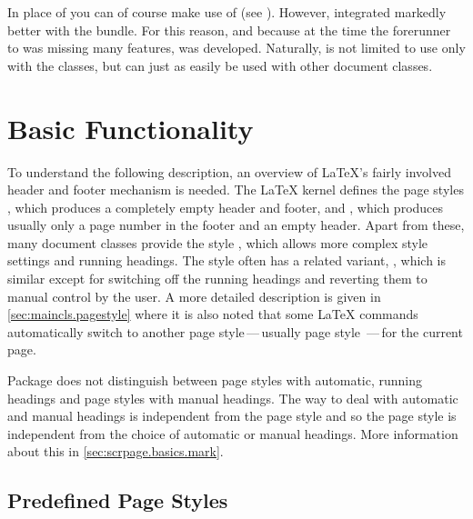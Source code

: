 \begin{Explain}
  In place of  you can of course make use of
   (see \cite{package:fancyhdr}). However,
   integrated markedly better with the {\KOMAScript}
  bundle. For this reason, and because at the time the forerunner to
   was missing many features,  was
  developed. Naturally,  is not limited to use only
  with the {\KOMAScript} classes, but can just as easily be used with
  other document classes.
\end{Explain}


\section{Basic Functionality}\label{sec:scrpage.basics}

\begin{Explain}%
  To understand the following description, an overview of {\LaTeX}'s fairly
  involved header and footer mechanism is needed.  The {\LaTeX} kernel defines
  the page styles , which produces a completely empty header
  and footer, and , which produces usually only a page number
  in the footer and an empty header.  Apart from these, many document classes
  provide the style , which allows more complex style
  settings and running
  headings.  The
   style often has a related variant,
  , which is similar except for switching off the
  running headings and reverting them to manual control
  by the user.  A more detailed description is given in
  \autoref{sec:maincls.pagestyle} where it is also noted that some {\LaTeX}
  commands automatically switch to another page style\,---\,usually page style
  \,---\,for the current page.
\end{Explain}


Package  does not distinguish between page styles with
automatic, running headings and page styles with manual headings. The way to
deal with automatic and manual headings is independent from the page style and
so the page style is independent from the choice of automatic or manual
headings. More information about this in \autoref{sec:scrpage.basics.mark}.

  
\subsection{Predefined Page Styles}\label{sec:scrpage.basics.buildIn}

